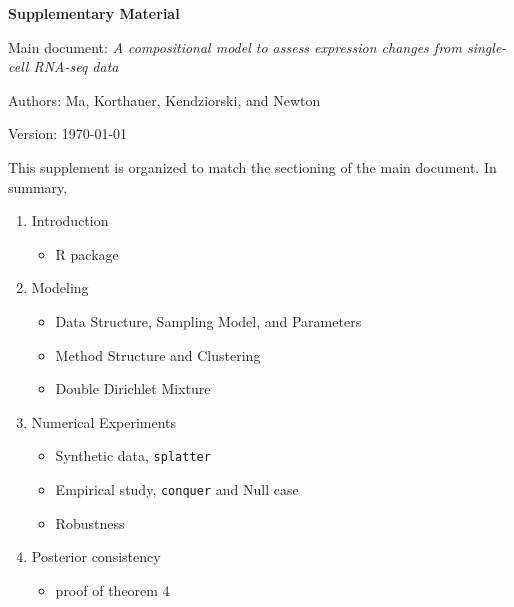 \documentclass[aoas,preprint]{imsart}
\begin{document}
\large
\centerline{\bf Supplementary Material }

\noindent
Main document: {\em A compositional model to assess expression changes from single-cell RNA-seq data}

\vspace{.2in}
\noindent
Authors: Ma, Korthauer, Kendziorski, and Newton

\vspace{.2in}
\noindent
Version:  \today

\vspace{.4in}

\noindent
This supplement is organized to match the sectioning of the main document.   In summary,

\begin{enumerate}
\item Introduction
   \begin{itemize}
   \item R package
   \end{itemize}
\item Modeling
 \begin{itemize}
  \item Data Structure, Sampling Model, and Parameters
  \item Method Structure and Clustering 
  \item Double Dirichlet Mixture
  \end{itemize}
\item Numerical Experiments
   \begin{itemize}
   \item Synthetic data, \verb+splatter+
   \item Empirical study, \verb+conquer+ and Null case
   \item Robustness
   \end{itemize}
\item Posterior consistency
  \begin{itemize}
   \item proof of theorem 4
  \end{itemize}
\end{enumerate}
\end{document}
